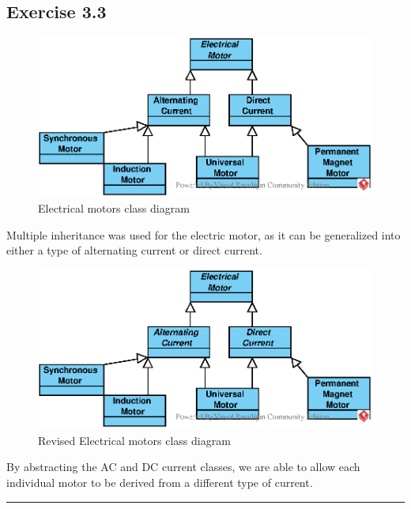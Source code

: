 \subsection{Exercise 3.3}
\begin{figure}[H]
    \centering
    \includegraphics[width=\textwidth]{images/EPS/ElectricalMotors.eps}
    \caption{Electrical motors class diagram}
    \label{fig:ElectricalMotors}
\end{figure}
Multiple inheritance was used for the electric motor, as it can be generalized into either a type of alternating current or direct current.
\begin{figure}[H]
    \centering
    \includegraphics[width=\textwidth]{images/EPS/ElectricalMotorsabstracted.eps}
    \caption{Revised Electrical motors class diagram}
    \label{fig:RevisedElectricalMotors}
\end{figure}
By abstracting the AC and DC current classes, we are able to allow each individual motor to be derived from a different type of current.

\noindent\rule{\textwidth}{0.4pt} %


